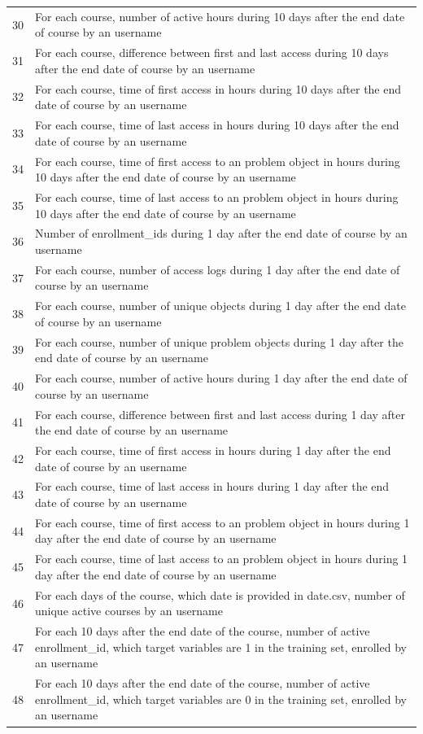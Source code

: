 \begin{center}
\begin{table}[ht]
\begin{minipage}{\textwidth}
{\begin{tabular}{|l|l|}
      30 & For each course, number of active hours during 10 days after the end date of course by an username \tabularnewline
      31 & For each course, difference between first and last access during 10 days after the end date of course by an username \tabularnewline
      32 & For each course, time of first access in hours during 10 days after the end date of course by an username \tabularnewline
      33 & For each course, time of last access in hours during 10 days after the end date of course by an username \tabularnewline
      34 & For each course, time of first access to an problem object in hours during 10 days after the end date of course by an username \tabularnewline
      35 & For each course, time of last access to an problem object in hours during 10 days after the end date of course by an username \tabularnewline
      36 & Number of enrollment\_ids during 1 day after the end date of course by an username \tabularnewline
      37 & For each course, number of access logs during 1 day after the end date of course by an username \tabularnewline
      38 & For each course, number of unique objects during 1 day after the end date of course by an username \tabularnewline
      39 & For each course, number of unique problem objects during 1 day after the end date of course by an username \tabularnewline
      40 & For each course, number of active hours during 1 day after the end date of course by an username \tabularnewline
      41 & For each course, difference between first and last access during 1 day after the end date of course by an username \tabularnewline
      42 & For each course, time of first access in hours during 1 day after the end date of course by an username \tabularnewline
      43 & For each course, time of last access in hours during 1 day after the end date of course by an username \tabularnewline
      44 & For each course, time of first access to an problem object in hours during 1 day after the end date of course by an username \tabularnewline
      45 & For each course, time of last access to an problem object in hours during 1 day after the end date of course by an username \tabularnewline
      46 & For each days of the course, which date is provided in date.csv, number of unique active courses by an username \tabularnewline
      47 & For each 10 days after the end date of the course, number of active enrollment\_id, which target variables are 1 in the training set, enrolled by an username \tabularnewline 
      48 & For each 10 days after the end date of the course, number of active enrollment\_id, which target variables are 0 in the training set, enrolled by an username \tabularnewline 

\end{tabular}}
\end{minipage}
\end{table}
\end{center}
